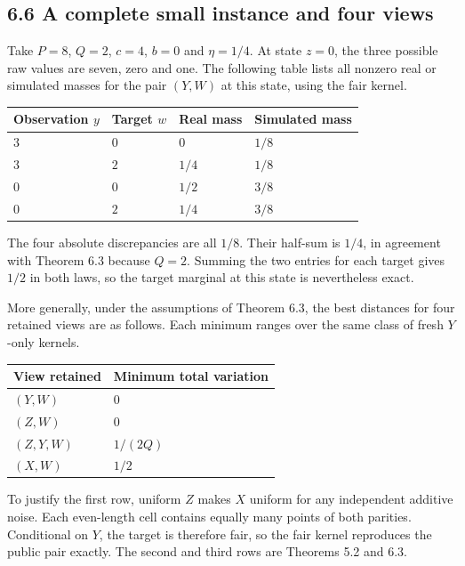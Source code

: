 \documentclass[
]{article}
\begin{document}
\subsection{6.6 A complete small instance and four
views}\label{a-complete-small-instance-and-four-views}

Take \(P=8\), \(Q=2\), \(c=4\), \(b=0\) and \(\eta=1/4\). At state
\(z=0\), the three possible raw values are seven, zero and one. The
following table lists all nonzero real or simulated masses for the pair
\((Y,W)\) at this state, using the fair kernel.

\begin{longtable}[]{@{}llll@{}}
\toprule\noalign{}
Observation \(y\) & Target \(w\) & Real mass & Simulated mass \\
\midrule\noalign{}
\endhead
\bottomrule\noalign{}
\endlastfoot
\(3\) & \(0\) & \(0\) & \(1/8\) \\
\(3\) & \(2\) & \(1/4\) & \(1/8\) \\
\(0\) & \(0\) & \(1/2\) & \(3/8\) \\
\(0\) & \(2\) & \(1/4\) & \(3/8\) \\
\end{longtable}

The four absolute discrepancies are all \(1/8\). Their half-sum is
\(1/4\), in agreement with Theorem 6.3 because \(Q=2\). Summing the two
entries for each target gives \(1/2\) in both laws, so the target
marginal at this state is nevertheless exact.

More generally, under the assumptions of Theorem 6.3, the best distances
for four retained views are as follows. Each minimum ranges over the
same class of fresh \(Y\)-only kernels.

\begin{longtable}[]{@{}ll@{}}
\toprule\noalign{}
View retained & Minimum total variation \\
\midrule\noalign{}
\endhead
\bottomrule\noalign{}
\endlastfoot
\((Y,W)\) & \(0\) \\
\((Z,W)\) & \(0\) \\
\((Z,Y,W)\) & \(1/(2Q)\) \\
\((X,W)\) & \(1/2\) \\
\end{longtable}

To justify the first row, uniform \(Z\) makes \(X\) uniform for any
independent additive noise. Each even-length cell contains equally many
points of both parities. Conditional on \(Y\), the target is therefore
fair, so the fair kernel reproduces the public pair exactly. The second
and third rows are Theorems 5.2 and 6.3.
\end{document}

